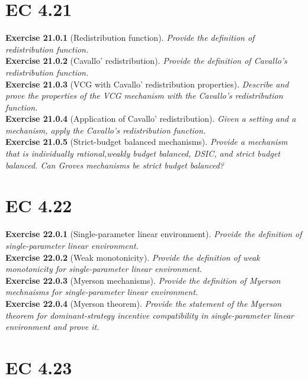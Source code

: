 \section{EC 4.21}

\textbf{Exercise 21.0.1} (Redistribution function). \textit{Provide the definition of redistribution function.}\\

\textbf{Exercise 21.0.2} (Cavallo’ redistribution). \textit{Provide the definition of Cavallo’s redistribution function.}\\

\textbf{Exercise 21.0.3} (VCG with Cavallo’ redistribution properties). \textit{Describe and prove the properties of the VCG mechanism with the Cavallo’s redistribution function.}\\

\textbf{Exercise 21.0.4} (Application of Cavallo’ redistribution). \textit{Given a setting and a mechanism, apply the Cavallo’s redistribution function.}\\

\textbf{Exercise 21.0.5} (Strict-budget balanced mechanisms). \textit{Provide a mechanism that is individually rational,weakly budget balanced, DSIC, and strict budget balanced. Can Groves mechanisms be strict budget balanced?}\\

\section{EC 4.22}

\textbf{Exercise 22.0.1} (Single-parameter linear environment). \textit{Provide the definition of single-parameter linear environment.}\\

\textbf{Exercise 22.0.2} (Weak monotonicity). \textit{Provide the definition of weak monotonicity for single-parameter linear environment.}\\

\textbf{Exercise 22.0.3} (Myerson mechanisms). \textit{Provide the definition of Myerson mechnaisms for single-parameter linear environment.}\\

\textbf{Exercise 22.0.4} (Myerson theorem). \textit{Provide the statement of the Myerson theorem for dominant-strategy incentive compatibility in single-parameter linear environment and prove it.}\\

\section{EC 4.23}

